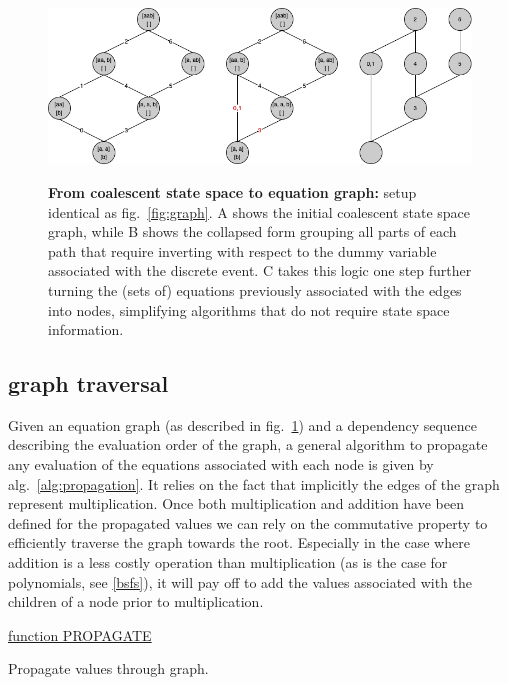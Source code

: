 \documentclass[10pt, a4]{article}
\begin{document}
\begin{figure}
\begin{center}
\includegraphics[scale=0.5]{figures/temp3.png}\label{fig:equation_graph}
\end{center}
\caption{\textbf{From coalescent state space to equation graph:} setup identical as fig.\ \ref{fig:graph}. A shows the initial coalescent state space graph, while B shows the collapsed form grouping all parts of each path that require inverting with respect to the dummy variable associated with the discrete event. C takes this logic one step further turning the (sets of) equations previously associated with the edges into nodes, simplifying algorithms that do not require state space information.}
\end{figure}

\subsection{graph traversal} \label{graph_traversal}

Given an equation graph (as described in fig.\ \ref{fig:equation_graph}) and a dependency sequence describing the evaluation order of the graph, a general algorithm to propagate any evaluation of the equations associated with each node is given by alg.\ \ref{alg:propagation}. It relies on the fact that implicitly the edges of the graph represent multiplication. Once both multiplication and addition have been defined for the propagated values we can rely on the commutative property to efficiently traverse the graph towards the root. Especially in the case where addition is a less costly operation than multiplication (as is the case for polynomials, see \ref{bsfs}), it will pay off to add the values associated with the children of a node prior to multiplication.

\begin{algorithm}\label{alg:propagation}
	
    \underline{function PROPAGATE}\;
    

    \caption{Propagate values through graph.}
\end{algorithm}
\end{document}
